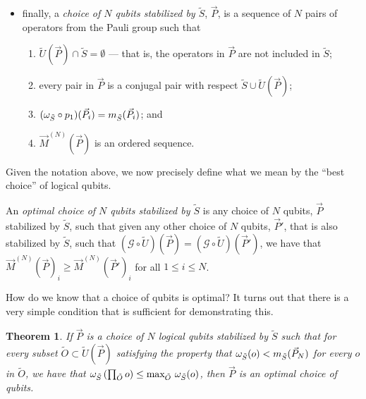 \documentclass[twocolumn,showpacs,preprintnumbers,amsmath,amssymb,nofootinbib,pra,floatfix]{revtex4-1}
\newtheorem{theorem}{Theorem}
\newenvironment{definition}[1][Definition]{\begin{trivlist}
\item[\hskip \labelsep {\bfseries #1}]}{\end{trivlist}}
\newcommand{\lst}{\vec}
\newcommand{\set}{\tilde}
\newcommand{\genfun}{\mathcal{G}}
\begin{document}
\begin{definition}
\begin{itemize}
\item finally, a \emph{choice of $N$ qubits stabilized by $\set S$}, $\lst P$, is a sequence of $N$ pairs of operators from the Pauli group such that 
\begin{enumerate}
\item $\set U(\lst P)\cap \set S = \emptyset$ --- that is, the operators in $\lst P$ are not included in $\set S$;
\item every pair in $\lst P$ is a conjugal pair with respect $\set S \cup \set U(\lst P)$;
\item $(\om_{\set S}\circ p_1)(\lst P_i)=m_{\set S}(\lst P_i)$; and
\item $\lst M^{(N)}(\lst P)$ is an ordered sequence.
\end{enumerate}
\end{itemize}

\end{definition}
Given the notation above, we now precisely define what we mean by the ``best choice'' of logical qubits.

\begin{definition}
An \emph{optimal choice of $N$ qubits stabilized by $\set S$} is any choice of $N$ qubits, $\lst P$ stabilized by $\set S$, such that given any other choice of $N$ qubits, $\lst P'$, that is also stabilized by $\set S$, such that $(\genfun\circ \set U)(\lst P)=(\genfun\circ \set U)(\lst P')$, we have that $\lst M^{(N)}(\lst P)_i \ge \lst M^{(N)}(\lst P')_i$ for all $1\le i \le N$.
\end{definition}
How do we know that a choice of qubits is optimal?  It turns out that there is a very simple condition that is sufficient for demonstrating this.

\begin{theorem}
\label{optimality-condition}
If $\lst P$ is a choice of $N$ logical qubits stabilized by $\set S$ such that for every subset $\set O\subset\set U(\lst P)$ satisfying the property that $\om_{\set S}(o)<m_{\set S}(\lst P_N)$ for every $o$ in $\set O$, we have that $\om_{\set S}\paren{\prod_{\set O} o}\le \text{max}_{\set O}\,\, \om_{\set S}(o)$, then $\lst P$ is an optimal choice of qubits.
\end{theorem}
\end{document}
